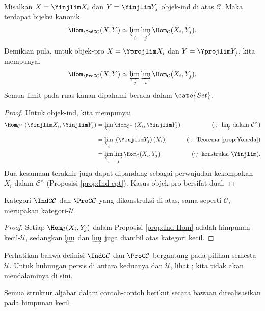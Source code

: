 \begin{proposition}\label{prop:Ind-Hom}
	Misalkan $X=\Yinjlim X_i$ dan $Y=\Yinjlim Y_j$ objek-ind di atas $\mathcal{C}$. Maka terdapat bijeksi kanonik
	\[ \Hom_{\IndC \mathcal{C}}(X, Y) \simeq \varprojlim_i \varinjlim_j \Hom_{\mathcal{C}}(X_i, Y_j). \]
	Demikian pula, untuk objek-pro $X=\Yprojlim X_i$ dan $Y=\Yprojlim Y_j$, kita mempunyai
	\[ \Hom_{\ProC \mathcal{C}}(X, Y) \simeq \varprojlim_j \varinjlim_i \Hom_{\mathcal{C}}(X_i, Y_j). \]
	Semua limit pada ruas kanan dipahami berada dalam $\cate{Set}$.
\end{proposition}
\begin{proof}
	Untuk objek-ind, kita mempunyai
	\begin{align*}
		\Hom_{\mathcal{C}^\wedge}\left(\Yinjlim X_i, \Yinjlim Y_j \right) & = \varprojlim_i \Hom_{\mathcal{C}^\wedge}\left( X_i, \Yinjlim Y_j \right) & (\because\; \varinjlim \; \text{dalam $\mathcal{C}^{\wedge}$}) \\
		& = \varprojlim_i \left[ \left( \Yinjlim Y_j \right)(X_i) \right] & (\because\; \text{Teorema \ref{prop:Yoneda}}) \\
		& = \varprojlim_i \varinjlim_j \Hom_{\mathcal{C}}(X_i, Y_j) & (\because\; \text{konstruksi }\Yinjlim).
	\end{align*}
	Dua kesamaan terakhir juga dapat dipandang sebagai perwujudan kekompakan $X_i$ dalam $\mathcal{C}^\wedge$ (Proposisi \ref{prop:Ind-cpt}). Kasus objek-pro bersifat dual.
\end{proof}

\begin{corollary}\label{prop:Ind-Pro-size}
	Kategori $\IndC\mathcal{C}$ dan $\ProC\mathcal{C}$ yang dikonstruksi di atas, sama seperti $\mathcal{C}$, merupakan kategori-$\mathcal{U}$.
\end{corollary}
\begin{proof}
	Setiap $\Hom_{\mathcal{C}}(X_i,Y_j)$ dalam Proposisi \ref{prop:Ind-Hom} adalah himpunan kecil-$\mathcal{U}$, sedangkan $\varprojlim$ dan $\varinjlim$ juga diambil atas kategori kecil.
\end{proof}

Perhatikan bahwa definisi $\IndC\mathcal{C}$ dan $\ProC\mathcal{C}$ bergantung pada pilihan semesta $\mathcal{U}$. Untuk hubungan persis di antara keduanya dan $\mathcal{U}$, lihat \cite[Proposisi 6.1.21]{KS06}; kita tidak akan mendalaminya di sini.

Semua struktur aljabar dalam contoh-contoh berikut secara bawaan direalisasikan pada himpunan kecil.

